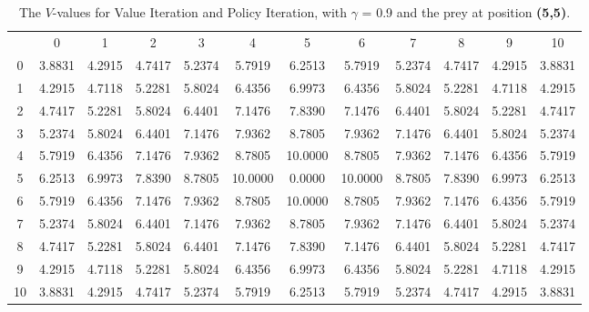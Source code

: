 \documentclass{article}
\begin{document}
\subsection*{}
\begin{table}[tbp]
\centering
\begin{footnotesize}
\begin{tabular} {c c c c c c c c c c c c}
 & 0 & 1 & 2 & 3 & 4 & 5 & 6 & 7 & 8 & 9 & 10 \\
0 &  3.8831 &  4.2915 &  4.7417 &  5.2374 &  5.7919 &  6.2513 &  5.7919 &  5.2374 &  4.7417 &  4.2915 &  3.8831\\
1 &  4.2915 &  4.7118 &  5.2281 &  5.8024 &  6.4356 &  6.9973 &  6.4356 &  5.8024 &  5.2281 &  4.7118 &  4.2915\\
2 &  4.7417 &  5.2281 &  5.8024 &  6.4401 &  7.1476 &  7.8390 &  7.1476 &  6.4401 &  5.8024 &  5.2281 &  4.7417\\
3 &  5.2374 &  5.8024 &  6.4401 &  7.1476 &  7.9362 &  8.7805 &  7.9362 &  7.1476 &  6.4401 &  5.8024 &  5.2374\\
4 &  5.7919 &  6.4356 &  7.1476 &  7.9362 &  8.7805 & 10.0000 &  8.7805 &  7.9362 &  7.1476 &  6.4356 &  5.7919\\
5 &  6.2513 &  6.9973 &  7.8390 &  8.7805 & 10.0000 &  0.0000 & 10.0000 &  8.7805 &  7.8390 &  6.9973 &  6.2513\\
6 &  5.7919 &  6.4356 &  7.1476 &  7.9362 &  8.7805 & 10.0000 &  8.7805 &  7.9362 &  7.1476 &  6.4356 &  5.7919\\
7 &  5.2374 &  5.8024 &  6.4401 &  7.1476 &  7.9362 &  8.7805 &  7.9362 &  7.1476 &  6.4401 &  5.8024 &  5.2374\\
8 &  4.7417 &  5.2281 &  5.8024 &  6.4401 &  7.1476 &  7.8390 &  7.1476 &  6.4401 &  5.8024 &  5.2281 &  4.7417\\
9 &  4.2915 &  4.7118 &  5.2281 &  5.8024 &  6.4356 &  6.9973 &  6.4356 &  5.8024 &  5.2281 &  4.7118 &  4.2915\\
10 &  3.8831 &  4.2915 &  4.7417 &  5.2374 &  5.7919 &  6.2513 &  5.7919 &  5.2374 &  4.7417 &  4.2915 &  3.8831\\\end{tabular}\\
\end{footnotesize}
\caption{The $V$-values for Value Iteration and Policy Iteration, with $\gamma$ = 0.9 and the prey at position \textbf{(5,5)}.}
\label{valueiteration4}
\end{table}
\FloatBarrier
\subsection*{}
\end{document}
